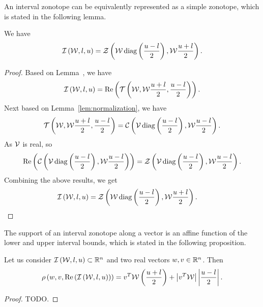 %
An interval zonotope can be equivalently represented as a simple
zonotope, which is stated in the following lemma.
%
\begin{lemma}
We have
%
\[
\mathit{\operatorname{\mathcal{I}}}\left(\mathcal{W},l,u\right)=\mathit{\mathcal{Z}}\left(\mathcal{W}\operatorname{diag}\left(\frac{u-l}{2}\right),\mathcal{W}\frac{u+l}{2}\right).
\]
%
\end{lemma}
%
\begin{proof}
Based on Lemma~\label{lem:iz-tcz-conversion}, we have 
%
\[
\mathit{\operatorname{\mathcal{I}}}\left(\mathcal{W},l,u\right)=\operatorname{Re}\left(\mathit{\operatorname{\mathcal{T}}}\left(\mathcal{W},\mathcal{W}\frac{u+l}{2},\frac{u-l}{2}\right)\right).
\]
%
Next based on Lemma~\ref{lem:normalization}, we have 
%
\[
\mathit{\operatorname{\mathcal{T}}}\left(\mathcal{W},\mathcal{W}\frac{u+l}{2},\frac{u-l}{2}\right)=\mathit{\mathcal{C}}\left(\mathcal{V}\operatorname{diag}\left(\frac{u-l}{2}\right),\mathcal{W}\frac{u-l}{2}\right).
\]
%
As $\mathcal{V}$ is real, so
%
\[
\operatorname{Re}\left(\mathit{\mathcal{C}}\left(\mathcal{V}\operatorname{diag}\left(\frac{u-l}{2}\right),\mathcal{W}\frac{u-l}{2}\right)\right)=\mathit{\mathcal{Z}}\left(\mathcal{V}\operatorname{diag}\left(\frac{u-l}{2}\right),\mathcal{W}\frac{u-l}{2}\right).
\]
%
Combining the above results, we get
\[
\mathit{\operatorname{\mathcal{I}}}\left(\mathcal{W},l,u\right)=\mathit{\mathcal{Z}}\left(\mathcal{W}\operatorname{diag}\left(\frac{u-l}{2}\right),\mathcal{W}\frac{u+l}{2}\right).~~~~\qedhere
\]
%
\end{proof}
%
The support of an interval zonotope along a vector is an affine
function of the lower and upper interval bounds, which is stated in
the following proposition.
%
\begin{lemma}
Let us consider $\mathit{\operatorname{\mathcal{I}}}\left(\mathcal{W},l,u\right)\subset\mathbb{R}^n$ and
two real vectors $w,v\in\mathbb{R}^n$.  Then
%
\[
\rho\left(w,v,\operatorname{Re}\left(\mathit{\operatorname{\mathcal{I}}}\left(\mathcal{W},l,u\right)\right)\right)=v^T\mathcal{W}\left(\frac{u+l}{2}\right)+\left|v^T\mathcal{W}\right|\left|\frac{u-l}{2}\right|.
\]
%
\end{lemma}
%
\begin{proof}
{\color{red}TODO}.
\end{proof}
%

























































